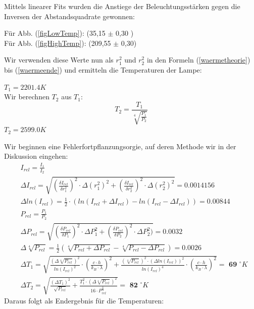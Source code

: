 \documentclass[12pt,a4paper,twopage]{article}
\begin{document}
Mittels linearer Fits wurden die Anstiege der Beleuchtungsstärken gegen die Inversen der Abstandsquadrate gewonnen:\\
\vspace{5mm}
\begin{center}
Für Abb. (\ref{figLowTemp}): \hspace{1cm}  (35,15 $\pm$ 0,30 ) \\
Für Abb. (\ref{figHighTemp}): \hspace{1cm} (209,55 $\pm$ 0,30) \\
\end{center}
\vspace{5mm}
Wir verwenden diese Werte nun als $r_1^2$ und $r_2^2$ in den Formeln (\ref{waermetheorie}) bis (\ref{waermeende}) und ermitteln die Temperaturen der Lampe: \\
\begin{center}
$T_1=2201.4 K$ \\
Wir berechnen $T_2$ aus $T_1$: \\
\begin{equation}
T_2=\frac{T_1}{\sqrt[4]{\frac{P_1}{P_2}}} 
\end{equation}
$T_2=2599.0 K$ \\
\end{center}
Wir beginnen eine Fehlerfortpflanzungsorgie, auf deren Methode wir in der Diskussion eingehen:
\begin{align*}
&I_{rel}=\frac{I_1}{I_2}\\
&\Delta I_{rel}=\sqrt{ \left(\frac{\delta I_{rel}}{\delta r_1^2}\right)^2 \cdot \Delta (r_1^2)^2 + \left(\frac{\delta I_{rel}}{\delta r_2^2}\right)^2 \cdot \Delta (r_2^2)^2 } = 0.0014156 \\
&\Delta ln (I_{rel})= \frac{1}{2} \cdot ( ln(I_{rel}+ \Delta I_{rel}) - ln ( I_{rel} - \Delta I_{rel}) ) =  0.00844\\
&P_{rel}=\frac{P_1}{P_2} \\
&\Delta P_{rel} = \sqrt{ \left(\frac{\delta P_{rel}}{\delta P_1}\right)^2 \cdot \Delta P_1^2 + \left(\frac{\delta P_{rel}}{\delta P_2}\right)^2 \cdot \Delta P_2^2)} =  0.0032 \\
&\Delta \sqrt[4]{P_{rel}} = \frac{1}{2} \left(  \sqrt[4]{P_{rel}+ \Delta P_{rel}} -\sqrt[4]{P_{rel}-\Delta P_{rel}} \right) = 0.0026 \\
&\Delta T_1 = \sqrt{ \frac{ (\Delta \sqrt[4]{P_{rel}})^2}{ln(I_{rel})^2} \cdot \left( \frac{c \cdot h}{k_B\cdot \lambda} \right) ^2 + \frac{ (\sqrt[4]{P_{rel}})^2 \cdot (\Delta ln(I_{rel}))^2}{ln(I_{rel})^4} \cdot \left( \frac{c \cdot h}{k_B \cdot \lambda}  \right) ^2} = \textbf{ 69 } ^{\circ} K \\
&\Delta T_2 = \sqrt{ \frac{ ( \Delta T_1)^2}{\sqrt{P_{rel}}} + \frac{T_1^2 \cdot ( \Delta \sqrt[4]{P_{rel}})^2}{16 \cdot P_{rel}^{\frac{6}{4}} } } = \textbf{ 82 } ^{\circ} K
\end{align*}
Daraus folgt als Endergebnis für die Temperaturen:
\begin{center}

\end{center}
\end{document}

